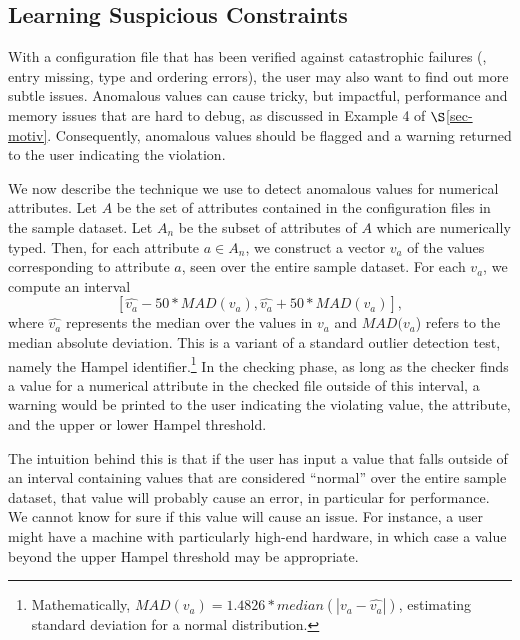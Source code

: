 

\subsection{Learning Suspicious Constraints}
\label{subsec-constraints}

With a configuration file that has been verified against catastrophic
failures (\eg, entry missing, type and ordering errors), 
the user may also want to find out more subtle issues.
Anomalous values can cause tricky, but impactful, performance and memory
issues that are hard to debug, as discussed in Example 4 of 
$\S$\ref{sec-motiv}. 
Consequently, anomalous values should be flagged and a warning returned
to the user indicating the violation.

We now describe the technique we use to detect anomalous values for 
numerical attributes. Let $A$ be the set of attributes contained in the 
configuration files in the sample dataset. 
Let $A_n$ be the subset of attributes of $A$ which are numerically typed. 
Then, for each attribute $a \in A_n$, we construct a vector $v_a$ of the 
values corresponding to attribute $a$, seen over the entire sample dataset.
For each $v_a$, we compute 
an interval  $$[\hat{v_a} - 50*MAD(v_a), \hat{v_a} + 50*MAD(v_a)],$$ 
where $\hat{v_a}$ represents the median over the values 
in $v_a$ and $MAD(v_a$) refers to the 
median absolute deviation. 
This is a variant of a standard outlier detection test, namely the Hampel identifier.\footnote{Mathematically, $MAD(v_a) = 1.4826* median(|v_a - \hat{v_a}|)$, estimating standard deviation 
for a normal distribution.} 
In the checking phase, as long as the checker finds a value for a numerical 
attribute in the checked file outside of this interval, 
a warning would be printed to the user indicating the violating value, 
the attribute, and the upper or lower Hampel threshold. 

The intuition behind this is that if the user has input a value 
that falls outside of an interval containing values that are considered 
``normal'' over the entire sample dataset, 
that value will probably cause an error, in particular for performance. 
We cannot know for sure if this value will cause an issue. 
For instance, a user might have a machine with 
particularly high-end hardware, 
in which case a value beyond the upper Hampel threshold may be appropriate. 
